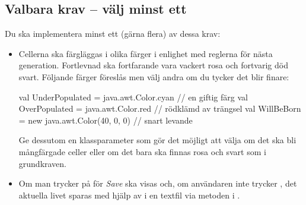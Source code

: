 \subsection{Valbara krav -- välj minst ett}

Du ska implementera minst ett (gärna flera) av dessa krav:
\begin{itemize}[nosep, label={$\square$}]
\item Cellerna ska färgläggas i olika färger i enlighet med reglerna för nästa generation. Fortlevnad ska fortfarande vara vackert rosa och fortvarig död svart. Följande färger föreslås men välj andra om du tycker det blir finare:
\begin{CodeSmall}
  val UnderPopulated = java.awt.Color.cyan  // en giftig färg
  val OverPopulated  = java.awt.Color.red   // rödklämd av trängsel
  val WillBeBorn     = new java.awt.Color(40, 0, 0)  // snart levande
\end{CodeSmall}
Ge dessutom  en klassparameter  som gör det möjligt att välja om det ska bli mångfärgade celler eller om det bara ska finnas rosa och svart som i grundkraven.

\item Om man trycker på  för \emph{Save} ska  visas och, om användaren inte trycker , det aktuella livet sparas med hjälp av  i en textfil via metoden  i .


\end{itemize}
